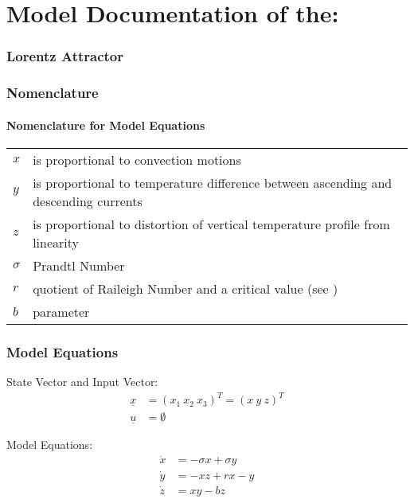 \documentclass[10pt,a4paper]{article}
\begin{document}
	\part*{Model Documentation of the:}
	\section*{Lorentz Attractor} %
	
	
	\section{Nomenclature} %
	\subsection{Nomenclature for Model Equations} %
	
	\begin{tabular}{ll}
		$x$ & is proportional to convection motions \\
		$y$ & is proportional to temperature difference between ascending and descending currents\\
		$z$ & is proportional to distortion of vertical temperature profile from linearity\\
		$\sigma$ & Prandtl Number \\
		$r$ & quotient of Raileigh Number and a critical value (see \cite{LOR63})\\
		$b$ & parameter
	\end{tabular}
	
	
	\section{Model Equations} %
	State Vector and Input Vector:
	\begin{align*}
		\underline{x} &= (x_1 \ x_2 \ x_3)^T = (x \ y \ z )^T \\
		\underline{u} &= \emptyset
	\end{align*}

	\noindent Model Equations:
	\begin{subequations}
	\begin{align}
		\dot{x} &= -\sigma x + \sigma y 	\\      %
		\dot{y} &= -xz + rx - y 	\\
		\dot{z} &= xy - bz	
	\end{align}
	\end{subequations}
\end{document}
